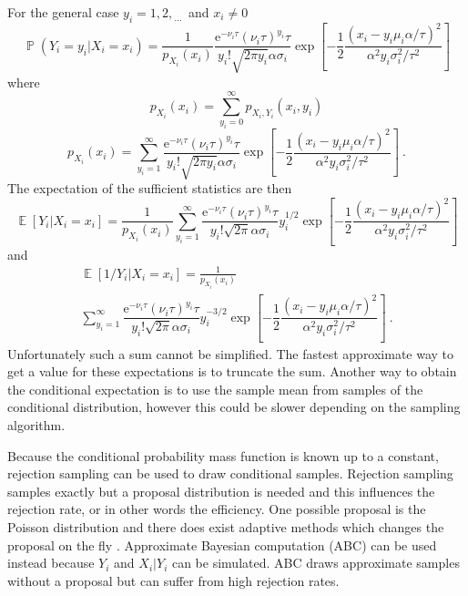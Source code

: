 \documentclass[12pt]{report}
\DeclareMathOperator{\expectation}{\mathbb{E}}
\DeclareMathOperator{\prob}{\mathbb{P}}
\newcommand{\euler}{\mathrm{e}}
\newcommand{\dotdotdot}{_{\phantom{.}\cdots}}
\begin{document}
For the general case $y_i=1,2,\dotdotdot$ and $x_i\neq0$
\begin{equation}
\prob\left(Y_i=y_i|X_i=x_i\right)=\frac{1}{p_{X_i}(x_i)}\dfrac{\euler^{-\nu_i\tau}(\nu_i\tau)^{y_i}\tau}{y_i!\sqrt{2\pi y_i}\alpha\sigma_i}
\exp\left[-\dfrac{1}{2}\dfrac{\left(x_i-y_i\mu_i\alpha/\tau\right)^2}{\alpha^2y_i\sigma_i^2/\tau^2}\right]
\end{equation}
where
\begin{equation*}
p_{X_i}(x_i)=\sum_{y_i=0}^{\infty}p_{X_i,Y_i}(x_i,y_i)
\end{equation*}
\begin{equation}
p_{X_i}(x_i)=\sum_{y_i=1}^{\infty}\dfrac{\euler^{-\nu_i\tau}(\nu_i\tau)^{y_i}\tau}{y_i!\sqrt{2\pi y_i}\alpha\sigma_i}
\exp\left[-\dfrac{1}{2}\dfrac{\left(x_i-y_i\mu_i\alpha/\tau\right)^2}{\alpha^2y_i\sigma_i^2/\tau^2}\right] \ .
\end{equation}
The expectation of the sufficient statistics are then
\begin{equation}
\expectation\left[Y_i|X_i=x_i\right]=
\frac{1}{p_{X_i}(x_i)}
\sum_{y_i=1}^{\infty}\dfrac{\euler^{-\nu_i\tau}(\nu_i\tau)^{y_i}\tau}{y_i!\sqrt{2\pi}\alpha\sigma_i}y_i^{1/2}
\exp\left[-\dfrac{1}{2}\dfrac{\left(x_i-y_i\mu_i\alpha/\tau\right)^2}{\alpha^2y_i\sigma_i^2/\tau^2}\right]
\end{equation}
and
\begin{multline}
\expectation\left[1/Y_i\right|\left.X_i=x_i\right]=
\frac{1}{p_{X_i}(x_i)}
\\
\sum_{y_i=1}^{\infty}\dfrac{\euler^{-\nu_i\tau}(\nu_i\tau)^{y_i}\tau}{y_i!\sqrt{2\pi}\alpha\sigma_i}y_i^{-3/2}
\exp\left[-\dfrac{1}{2}\dfrac{\left(x_i-y_i\mu_i\alpha/\tau\right)^2}{\alpha^2y_i\sigma_i^2/\tau^2}\right] \ .
\end{multline}
Unfortunately such a sum cannot be simplified. The fastest approximate way to get a value for these expectations is to truncate the sum. Another way to obtain the conditional expectation is to use the sample mean from samples of the conditional distribution, however this could be slower depending on the sampling algorithm.

Because the conditional probability mass function is known up to a constant, rejection sampling can be used to draw conditional samples. Rejection sampling samples exactly but a proposal distribution is needed and this influences the rejection rate, or in other words the efficiency. One possible proposal is the Poisson distribution and there does exist adaptive methods which changes the proposal on the fly \cite{casella2004generalized}. Approximate Bayesian computation (ABC) \cite{marin2012approximate} can be used instead because $Y_i$ and $X_i|Y_i$ can be simulated. ABC draws approximate samples without a proposal but can suffer from high rejection rates.
\end{document}
